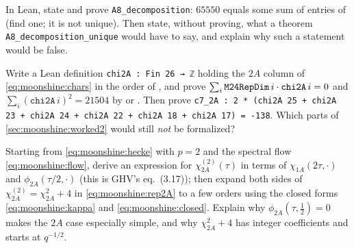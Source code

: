\begin{exercise}[$\star\star$]\label{exo:moonshine:lean1}
In Lean, state and prove \texttt{A8\_decomposition}: $65550$ equals some sum of entries of
 (find one; it is not unique). Then state, without proving, what a theorem
\texttt{A8\_decomposition\_unique} would have to say, and explain why such a statement would
be false.
\end{exercise}

\begin{exercise}[$\star\star\star$]\label{exo:moonshine:lean2}
Write a Lean definition \texttt{chi2A : Fin 26 → ℤ} holding the $2A$ column of
\eqref{eq:moonshine:chars} in the order of , and prove
$\sum_i\texttt{M24RepDim}\,i\cdot\texttt{chi2A}\,i=0$ and $\sum_i(\texttt{chi2A}\,i)^2=21504$
by  or . Then prove
\texttt{c7\_2A : 2 * (chi2A 25 + chi2A 23 + chi2A 24 + chi2A 22 + chi2A 18 + chi2A 17) = -138}.
Which parts of \cref{sec:moonshine:worked2} would still \emph{not} be formalized?
\end{exercise}

\begin{exercise}[$\star\star\star$]\label{exo:moonshine:rep}
Starting from \eqref{eq:moonshine:hecke} with $p=2$ and the spectral flow
\eqref{eq:moonshine:flow}, derive an expression for $\chi^{(2)}_{2A}(\tau)$ in terms of
$\chi_{1A}(2\tau,\cdot)$ and $\phi_{2A}(\tau/2,\cdot)$ (this is GHV's eq.~(3.17)); then
expand both sides of $\chi^{(2)}_{2A}=\chi_{2A}^2+4$ in \eqref{eq:moonshine:rep2A} to a
few orders using the closed forms \eqref{eq:moonshine:kappa} and
\eqref{eq:moonshine:closed}. Explain why $\phi_{2A}(\tau,\tfrac12)=0$ makes the $2A$ case
especially simple, and why $\chi_{2A}^2+4$ has integer coefficients and starts at $q^{-1/2}$.
\end{exercise}

